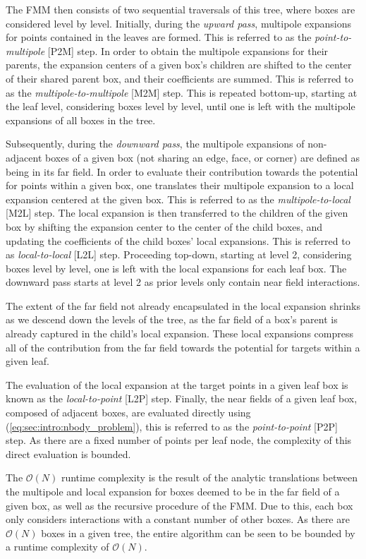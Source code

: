 \documentclass{IEEEcsmag}
\begin{document}
The FMM then consists of two sequential traversals of this tree, where boxes are considered level by level. Initially, during the \textit{upward pass}, multipole expansions for points contained in the leaves are formed. This is referred to as the \textit{point-to-multipole} [P2M] step. In order to obtain the multipole expansions for their parents, the expansion centers of a given box's children are shifted to the center of their shared parent box, and their coefficients are summed. This is referred to as the \textit{multipole-to-multipole} [M2M] step. This is repeated bottom-up, starting at the leaf level, considering boxes level by level, until one is left with the multipole expansions of all boxes in the tree.

Subsequently, during the \textit{downward pass}, the multipole expansions of non-adjacent boxes of a given box (not sharing an edge, face, or corner) are defined as being in its far field. In order to evaluate their contribution towards the potential for points within a given box, one translates their multipole expansion to a local expansion centered at the given box. This is referred to as the \textit{multipole-to-local} [M2L] step. The local expansion is then transferred to the children of the given box by shifting the expansion center to the center of the child boxes, and updating the coefficients of the child boxes' local expansions. This is referred to as \textit{local-to-local} [L2L] step. Proceeding top-down, starting at level 2, considering boxes level by level, one is left with the local expansions for each leaf box. The downward pass starts at level 2 as prior levels only contain near field interactions.

The extent of the far field not already encapsulated in the local expansion shrinks as we descend down the levels of the tree, as the far field of a box's parent is already captured in the child's local expansion. These local expansions compress all of the contribution from the far field towards the potential for targets within a given leaf.

The evaluation of the local expansion at the target points in a given leaf box is known as the \textit{local-to-point} [L2P] step. Finally, the near fields of a given leaf box, composed of adjacent boxes, are evaluated directly using (\ref{eq:sec:intro:nbody_problem}), this is referred to as the \textit{point-to-point} [P2P] step. As there are a fixed number of points per leaf node, the complexity of this direct evaluation is bounded.

The $\mathcal{O}(N)$ runtime complexity is the result of the analytic translations between the multipole and local expansion for boxes deemed to be in the far field of a given box, as well as the recursive procedure of the FMM. Due to this, each box only considers interactions with a constant number of other boxes. As there are $\mathcal{O}(N)$ boxes in a given tree, the entire algorithm can be seen to be bounded by a runtime complexity of $\mathcal{O}(N)$.
\end{document}

